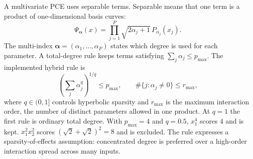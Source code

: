 \documentclass[10pt,aps,prd,twocolumn,nofootinbib]{revtex4-2}
\begin{document}
A multivariate PCE uses separable terms.  Separable means that one term is a
product of one-dimensional basis curves:
\begin{equation}
  \Psi_{\boldsymbol\alpha}(x)
  =\prod_{j=1}^{P}
  \sqrt{2\alpha_j+1}\,P_{\alpha_j}(x_j).
  \label{eq:pce-term}
\end{equation}
The multi-index $\boldsymbol\alpha=(\alpha_1,\ldots,\alpha_P)$ states which
degree is used for each parameter.  A total-degree rule keeps terms satisfying
$\sum_j\alpha_j\le p_{\max}$.  The implemented hybrid rule is
\begin{equation*}
 \left(\sum_j\alpha_j^q\right)^{1/q}\le p_{\max},
 \qquad
 \#\{j:\alpha_j\ne0\}\le r_{\max},
\end{equation*}
where $q\in(0,1]$ controls hyperbolic sparsity and $r_{\max}$ is the maximum
interaction order, the number of distinct parameters allowed in one
product.  At $q=1$ the first rule is ordinary total degree.  With
$p_{\max}=4$ and $q=0.5$, $x_1^4$ scores $4$ and is kept.
$x_1^2x_2^2$ scores $(\sqrt2+\sqrt2)^2=8$ and is excluded.  The rule expresses
a sparsity-of-effects assumption: concentrated degree is preferred over a
high-order interaction spread across many inputs.
\end{document}
